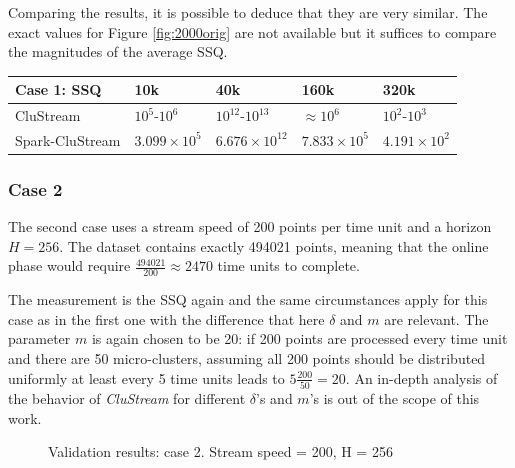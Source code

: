 \documentclass{llncs}
\begin{document}
Comparing the results, it is possible to deduce that they are very similar. The exact values for Figure \ref{fig:2000orig} are not available but it suffices to compare the magnitudes of the average SSQ. 

\begin{center}
\begin{tabular}{|l|l|l|l|l|}\hline
\textbf{Case 1: SSQ} & \textbf{10k} & \textbf{40k} & \textbf{160k} & \textbf{320k}\\\hline
CluStream & $10^5$-$10^6$ & $10^{12}$-$10^{13}$ & $\approx 10^6$ & $10^2$-$10^3$\\\hline
Spark-CluStream & $3.099\times10^5$ & $6.676\times10^{12}$ & $7.833\times10^5$ & $4.191\times10^2$\\\hline
\end{tabular}
\end{center}



\subsubsection{Case 2}

The second case uses a stream speed of 200 points per time unit and a horizon $H=256$. The dataset contains exactly 494021 points, meaning that the online phase would require $\frac{494021}{200} \approx 2470$ time units to complete.

The measurement is the SSQ again and the same circumstances apply for this case as in the first one with the difference that here $\delta$ and $m$ are relevant. The parameter $m$ is again chosen to be 20: if 200 points are processed every time unit and there are 50 micro-clusters, assuming all 200 points should be distributed uniformly at least every 5 time units leads to $5\frac{200}{50}=20$. An in-depth analysis of the behavior of \textit{CluStream} for different $\delta$'s and $m$'s is out of the scope of this work. 


\begin{figure}[h]
\hfill
{}
\hfill
{}
\hfill
\caption{Validation results: case 2. Stream speed = 200, H = 256}
\label{fig:200h256}
\end{figure}
\end{document}
